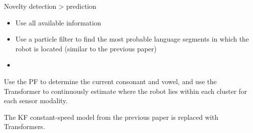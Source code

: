 \begin{frame}[allowframebreaks]{Novelty detection > prediction}
    \begin{itemize}
        \item Use all available information
        \item Use a particle filter to find the most probable language segments in which the robot is located (similar to the previous paper)
        \item
    \end{itemize}
    
    Use the PF to determine the current consonant and vowel, and use the Transformer to continuously estimate where the robot lies within each cluster for each sensor modality.
    
    The KF constant-speed model from the previous paper is replaced with Transformers.
\end{frame}